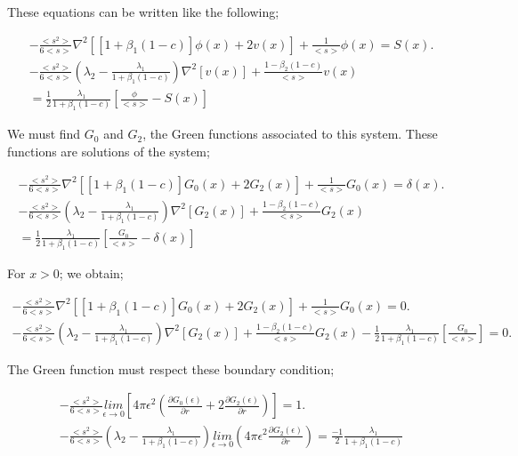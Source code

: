 \documentclass[preprint,12pt]{elsarticle}
\newcommand{\bl}{\big<}
\newcommand{\bg}{\big>}
\begin{document}
These equations can be written like the following;

\begin{align}
-\frac{\bl s^2 \bg}{6\bl s \bg} \nabla^2 \left[\left[1+\beta_1(1-c)\right]\phi(x)+ 2v(x)\right] + \frac{1}{\bl s \bg} \phi(x) = S(x). \\
-\frac{\bl s^2 \bg}{6\bl s \bg}\left(\lambda_2 - \frac{\lambda_1}{1+\beta_1(1-c)}\right) \nabla^2 \left[v(x)\right] + \frac{1-\beta_2(1-c)}{\bl s \bg} v(x) \\= \frac{1}{2} \frac{\lambda_1}{1+\beta_1(1-c)}\left[\frac{\phi}{\bl s \bg} - S(x)\right]
\end{align}

We must find $G_0$ and $G_2$, the Green functions associated to this system. These functions are solutions of the system;

\begin{align}
-\frac{\bl s^2 \bg}{6\bl s \bg} \nabla^2 \left[\left[1+\beta_1(1-c)\right]G_0(x)+ 2G_2(x)\right] + \frac{1}{\bl s \bg}G_0(x) = \delta(x). \\
-\frac{\bl s^2 \bg}{6\bl s \bg}\left(\lambda_2 - \frac{\lambda_1}{1+\beta_1(1-c)}\right) \nabla^2 \left[G_2(x)\right] + \frac{1-\beta_2(1-c)}{\bl s \bg} G_2(x) \\= \frac{1}{2} \frac{\lambda_1}{1+\beta_1(1-c)}\left[\frac{G_0}{\bl s \bg} - \delta(x)\right]
\end{align}

For $x>0$; we obtain;

\begin{align}
-\frac{\bl s^2 \bg}{6\bl s \bg} \nabla^2 \left[\left[1+\beta_1(1-c)\right]G_0(x)+ 2G_2(x)\right] + \frac{1}{\bl s \bg}G_0(x) = 0. \\
-\frac{\bl s^2 \bg}{6\bl s \bg}\left(\lambda_2 - \frac{\lambda_1}{1+\beta_1(1-c)}\right) \nabla^2 \left[G_2(x)\right] + \frac{1-\beta_2(1-c)}{\bl s \bg} G_2(x) - \frac{1}{2} \frac{\lambda_1}{1+\beta_1(1-c)}\left[\frac{G_0}{\bl s \bg}\right] = 0.
\end{align}

The Green function must respect these boundary condition;

\begin{align}
-\frac{\bl s^2 \bg}{6\bl s \bg} \underset{\epsilon \rightarrow 0}{lim} \left[4\pi \epsilon^2\left(\frac{\partial G_0(\epsilon)}{\partial r} + 2\frac{\partial G_2(\epsilon)}{\partial r} \right)\right]=1.\\
-\frac{\bl s^2 \bg}{6\bl s \bg}\left(\lambda_2 - \frac{\lambda_1}{1+\beta_1(1-c)}\right) \underset{\epsilon \rightarrow 0}{lim} \left(4\pi \epsilon^2 \frac{\partial G_2(\epsilon)}{\partial r}\right) = \frac{-1}{2}\frac{\lambda_1}{1+\beta_1(1-c)}
\end{align}
\end{document}
